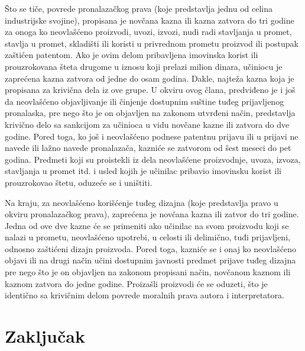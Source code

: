 \documentclass[a4paper]{article}
\begin{document}
Što se tiče, povrede pronalazačkog prava (koje predstavlja jednu od celina industrijske svojine), propisana je novčana kazna ili kazna zatvora do tri godine za onoga ko neovlašćeno proizvodi, uvozi, izvozi, nudi radi stavljanja u promet, stavlja u promet, skladišti ili koristi u privrednom prometu proizvod ili postupak zaštićen patentom. Ako je ovim delom pribavljena imovinska korist ili prouzrokovana šteta drugome u iznosu koji prelazi milion dinara, učiniocu je zaprećena kazna zatvora od jedne do osam godina. Dakle, najteža kazna koja je propisana za krivična dela iz ove grupe. U okviru ovog člana, predviđeno je i još da neovlašćeno objavljivanje ili činjenje dostupnim suštine tuđeg prijavljenog pronalaska, pre nego što je on objavljen na zakonom utvrđeni način, predstavlja krivično delo sa sankcijom za učinioca u vidu novčane kazne ili zatvora do dve godine. Pored toga, ko još i neovlašćeno podnese patentnu prijavu ili u prijavi ne navede ili lažno navede pronalazača, kazniće se zatvorom od šest meseci do pet godina. Predmeti koji su proistekli iz dela neovlašćene proizvodnje, uvoza, izvoza, stavljanja u promet itd. i usled kojih je učinilac pribavio imovinsku korist ili prouzrokovao štetu, oduzeće se i uništiti.

Na kraju, za neovlašćeno korišćenje tuđeg dizajna (koje predstavlja pravo u okviru pronalazačkog prava), zaprećena je novčana kazna ili zatvor do tri godine. Jedna od ove dve kazne će se primeniti ako učinilac na svom proizvodu koji se nalazi u prometu, neovlašćeno upotrebi, u celosti ili delimično, tuđi prijavljeni, odnosno zaštićeni dizajn proizvoda. Pored toga, kazniće se i onaj ko neovlašćeno objavi ili na drugi način učini dostupnim javnosti predmet prijave tuđeg dizajna pre nego što je on objavljen na zakonom propisani način, novčanom kaznom ili kaznom zatvora do jedne godine. Proizašli proizvodi će se oduzeti, što je identično sa krivičnim delom povrede moralnih prava autora i interpretatora.


\label{sec:srb}

\section{Zaključak}
\label{sec:zakljucak}
\end{document}
